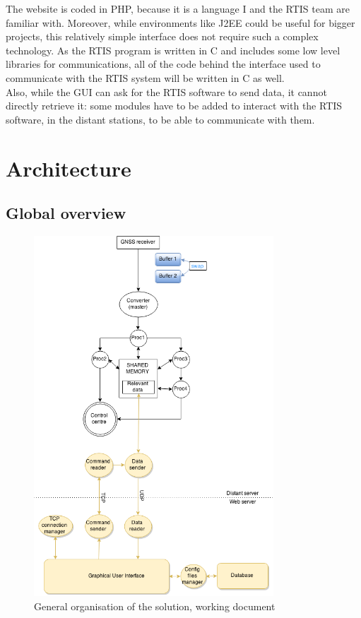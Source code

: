 \documentclass{themeensg}
\begin{document}
The website is coded in PHP, because it is a language I and the RTIS team are familiar with. Moreover, while environments like J2EE could be useful for bigger projects, this relatively simple interface does not require such a complex technology.
As the RTIS program is written in C and includes some low level libraries for communications, all of the code behind the interface used to communicate with the RTIS system will be written in C as well.\\

Also, while the GUI can ask for the RTIS software to send data, it cannot directly retrieve it: some modules have to be added to interact with the RTIS software, in the distant stations, to be able to communicate with them.

\section{Architecture}
\subsection{Global overview}

\begin{figure}[!hb]
	\centering
	\includegraphics[width=0.8\textwidth]{global_flowchart}
	\caption{General organisation of the solution, working document}
	\label{generalOrganisation}
\end{figure}
\end{document}
